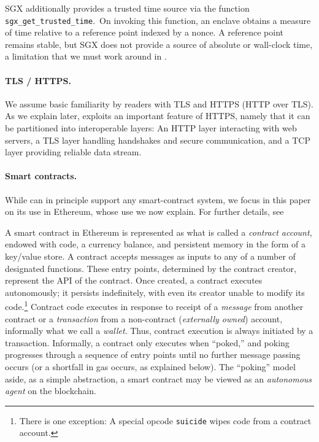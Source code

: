 SGX additionally provides a trusted time source via the function \texttt{sgx\_get\_trusted\_time}.~On invoking this function, an enclave obtains a measure of time relative to a reference point indexed by a nonce. A reference point remains stable, but SGX does not provide a source of absolute or wall-clock time, a limitation that we must work around in \tc.

\vspace{-2mm}
\paragraph{\bf TLS / HTTPS.}

We assume basic familiarity by readers with TLS and HTTPS (HTTP over TLS). As we explain later, \tc exploits an important feature of HTTPS, namely that it can be partitioned into interoperable layers: An HTTP layer interacting with web servers, a TLS layer handling handshakes and secure communication, and a TCP layer providing reliable data stream. 

\vspace{-2mm}
\paragraph{\bf Smart contracts.}
\label{sec:contracts-and-gas}

While \tc can in principle support any smart-contract system, we focus in this paper on its use in Ethereum, whose use we now explain. For further details, see~\cite{whitepaper,yellowpaper}

A smart contract in Ethereum is represented as what is called a \emph{contract account}, endowed with code, a currency balance, and persistent memory in the form of a key/value store. A contract accepts messages as inputs to any of a number of designated functions. These entry points, determined by the contract creator, represent the API of the contract. Once created, a contract executes autonomously; it persists indefinitely, with even its creator unable to modify its code.\footnote{There is one exception: A special opcode \texttt{suicide} wipes code from a contract account.} Contract code executes in response to receipt of a \emph{message} from another contract or a \emph{transaction} from a non-contract (\emph{externally owned}) account, informally what we call a \emph{wallet}. Thus, contract execution is always initiated by a transaction. Informally, a contract only executes when ``poked,'' and poking progresses through a sequence of entry points until no further message passing occurs (or a shortfall in gas occurs, as explained below). The ``poking'' model aside, as a simple abstraction, a smart contract may be viewed as an {\em autonomous agent} on the blockchain.


